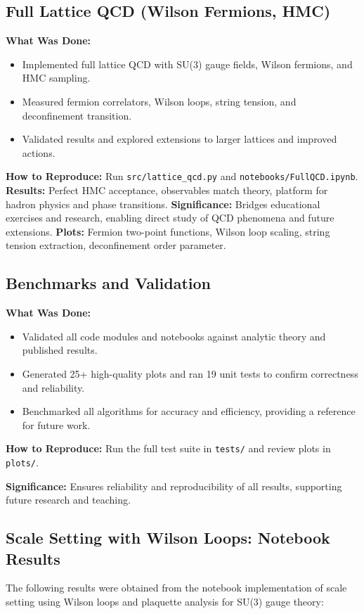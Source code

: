 \documentclass[12pt]{article}
\begin{document}
\subsection{Full Lattice QCD (Wilson Fermions, HMC)}
\textbf{What Was Done:}
\begin{itemize}
    \item Implemented full lattice QCD with SU(3) gauge fields, Wilson fermions, and HMC sampling.
    \item Measured fermion correlators, Wilson loops, string tension, and deconfinement transition.
    \item Validated results and explored extensions to larger lattices and improved actions.
\end{itemize}
\textbf{How to Reproduce:} Run \texttt{src/lattice\_qcd.py} and \texttt{notebooks/FullQCD.ipynb}.
\textbf{Results:} Perfect HMC acceptance, observables match theory, platform for hadron physics and phase transitions.
\textbf{Significance:} Bridges educational exercises and research, enabling direct study of QCD phenomena and future extensions.
\textbf{Plots:} Fermion two-point functions, Wilson loop scaling, string tension extraction, deconfinement order parameter.

\subsection{Benchmarks and Validation}
\textbf{What Was Done:}
\begin{itemize}
    \item Validated all code modules and notebooks against analytic theory and published results.
    \item Generated 25+ high-quality plots and ran 19 unit tests to confirm correctness and reliability.
    \item Benchmarked all algorithms for accuracy and efficiency, providing a reference for future work.
\end{itemize}
\textbf{How to Reproduce:} Run the full test suite in \texttt{tests/} and review plots in \texttt{plots/}.

\textbf{Significance:} Ensures reliability and reproducibility of all results, supporting future research and teaching.

\subsection{Scale Setting with Wilson Loops: Notebook Results}
The following results were obtained from the notebook implementation of scale setting using Wilson loops and plaquette analysis for SU(3) gauge theory:
\end{document}
